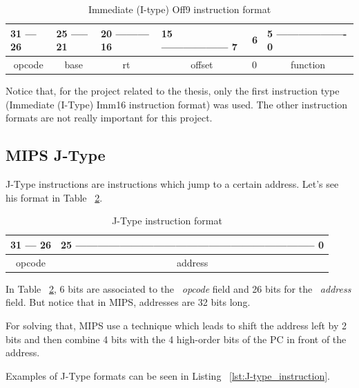 \documentclass[
  oneside,
  11pt, a4paper,
  footinclude=true,
  headinclude=true,
  cleardoublepage=empty
]{scrbook}
\begin{document}
\begin{table}[h!]
\centering
\begin{tabular}{l|l|l|l|l|l}
31 --- 26                    & 25 ----- 21               & 20 --------- 16         & 15 ------------------ 7     & 6 & 5 ------------------- 0       \\ \hline
\multicolumn{1}{|c|}{opcode} & \multicolumn{1}{c|}{base} & \multicolumn{1}{c|}{rt} & \multicolumn{1}{c|}{offset} & 0 & \multicolumn{1}{c|}{function} \\ \hline
\end{tabular}
\caption{Immediate (I-type) Off9 instruction format}
\label{tbl:imm_off9_instruction_format}
\end{table}

Notice that, for the project related to the thesis, only the first instruction type (Immediate (I-Type) Imm16 instruction format) was used. The other instruction formats are not really important for this project.


\subsection{MIPS J-Type}
J-Type instructions are instructions which jump to a certain address.
Let's see his format in Table ~\ref{tbl:j-type_instruction_format}.

\begin{table}[h!]
\centering
\begin{tabular}{l|l|l|l|l|l}
31 --- 26                    & \multicolumn{5}{l}{25 ----------------------------------------------------------------- 0} \\ \hline
\multicolumn{1}{|c|}{opcode} & \multicolumn{5}{c|}{address}                                                                \\ \hline
\end{tabular}
\caption{J-Type instruction format}
\label{tbl:j-type_instruction_format}
\end{table}

In Table ~\ref{tbl:j-type_instruction_format}, 6 bits are associated to the ~\textit{opcode} field and 26 bits for the ~\textit{address} field.
But notice that in MIPS, addresses are 32 bits long. 

For solving that, MIPS use a technique which leads to shift the address left by 2 bits and then combine 4 bits with the 4 high-order bits of the PC in front of the address.

Examples of J-Type formats can be seen in Listing ~\ref{lst:J-type_instruction}.
\end{document}

